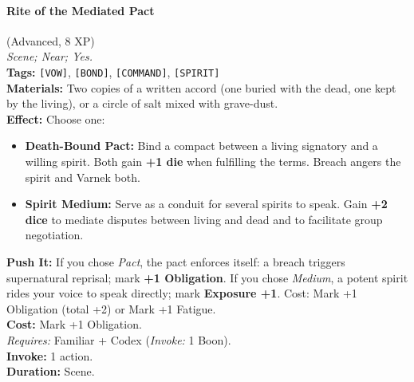 \paragraph{Rite of the Mediated Pact} (Advanced, 8 XP) \hfill \\
\emph{Scene; Near; Yes.} \\
\textbf{Tags:} \texttt{[VOW]}, \texttt{[BOND]}, \texttt{[COMMAND]}, \texttt{[SPIRIT]} \\
\textbf{Materials:} Two copies of a written accord (one buried with the dead, one kept by the living), or a circle of salt mixed with grave-dust. \\
\textbf{Effect:} Choose one:
\begin{itemize}
  \item \textbf{Death-Bound Pact:} Bind a compact between a living signatory and a willing spirit. Both gain \textbf{+1 die} when fulfilling the terms. Breach angers the spirit and Varnek both.
  \item \textbf{Spirit Medium:} Serve as a conduit for several spirits to speak. Gain \textbf{+2 dice} to mediate disputes between living and dead and to facilitate group negotiation.
\end{itemize}
\textbf{Push It:} If you chose \textit{Pact}, the pact enforces itself: a breach triggers supernatural reprisal; mark \textbf{+1 Obligation}. If you chose \textit{Medium}, a potent spirit rides your voice to speak directly; mark \textbf{Exposure +1}. Cost: Mark +1 Obligation (total +2) or Mark +1 Fatigue. \\
\textbf{Cost:} Mark +1 Obligation. \\
\textit{Requires:} Familiar + Codex (\textit{Invoke:} 1 Boon). \\
\textbf{Invoke:} 1 action. \\
\textbf{Duration:} Scene.

